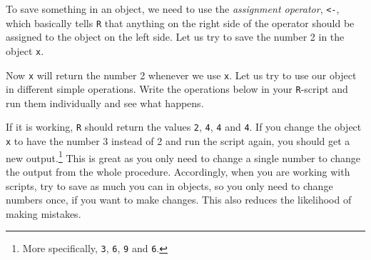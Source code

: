 \documentclass[12pt,oneside]{reedthesis}
\theoremstyle{definition}
\theoremstyle{definition}
\theoremstyle{definition}
\theoremstyle{remark}
\begin{document}
  To save something in an object, we need to use the \emph{assignment
  operator}, \texttt{\textless{}-}, which basically tells \texttt{R} that
  anything on the right side of the operator should be assigned to the
  object on the left side. Let us try to save the number 2 in the object
  \texttt{x}.
  \begin{Shaded}
  \begin{Highlighting}[]
  \StringTok{ }
  \end{Highlighting}
  \end{Shaded}
  Now \texttt{x} will return the number 2 whenever we use \texttt{x}. Let
  us try to use our object in different simple operations. Write the
  operations below in your \texttt{R}-script and run them individually and
  see what happens.
  \begin{Shaded}
  \begin{Highlighting}[]
  \OperatorTok{*}\StringTok{ }
  \OperatorTok{*}\StringTok{ }
  \OperatorTok{+}\StringTok{ }
  \end{Highlighting}
  \end{Shaded}
  If it is working, \texttt{R} should return the values \texttt{2},
  \texttt{4}, \texttt{4} and \texttt{4}. If you change the object
  \texttt{x} to have the number 3 instead of 2 and run the script again,
  you should get a new output.\footnote{More specifically, \texttt{3},
    \texttt{6}, \texttt{9} and \texttt{6}.} This is great as you only need
  to change a single number to change the output from the whole procedure.
  Accordingly, when you are working with scripts, try to save as much you
  can in objects, so you only need to change numbers once, if you want to
  make changes. This also reduces the likelihood of making mistakes.
  
\end{document}
